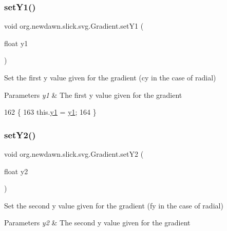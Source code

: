 \subsubsection{\texorpdfstring{set\+Y1()}{setY1()}}
{\footnotesize\ttfamily void org.\+newdawn.\+slick.\+svg.\+Gradient.\+set\+Y1 (\begin{DoxyParamCaption}\item[{float}]{y1 }\end{DoxyParamCaption})\hspace{0.3cm}{\ttfamily [inline]}}

Set the first y value given for the gradient (cy in the case of radial)


\begin{DoxyParams}{Parameters}
{\em y1} & The first y value given for the gradient \\
\hline
\end{DoxyParams}

\begin{DoxyCode}
162                                 \{
163         this.\mbox{\hyperlink{classorg_1_1newdawn_1_1slick_1_1svg_1_1_gradient_a6dd1b7c9e7ab1e8e2ba41232cd933046}{y1}} = \mbox{\hyperlink{classorg_1_1newdawn_1_1slick_1_1svg_1_1_gradient_a6dd1b7c9e7ab1e8e2ba41232cd933046}{y1}};
164     \}
\end{DoxyCode}
\mbox{\label{classorg_1_1newdawn_1_1slick_1_1svg_1_1_gradient_a817cc71437838163b257637a10b37ca2}} 
\subsubsection{\texorpdfstring{set\+Y2()}{setY2()}}
{\footnotesize\ttfamily void org.\+newdawn.\+slick.\+svg.\+Gradient.\+set\+Y2 (\begin{DoxyParamCaption}\item[{float}]{y2 }\end{DoxyParamCaption})\hspace{0.3cm}{\ttfamily [inline]}}

Set the second y value given for the gradient (fy in the case of radial)


\begin{DoxyParams}{Parameters}
{\em y2} & The second y value given for the gradient \\
\hline
\end{DoxyParams}

